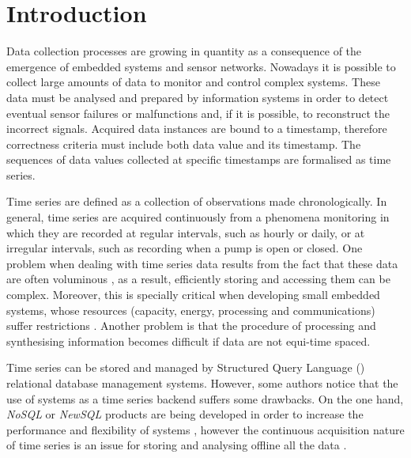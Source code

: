 


 

\section{Introduction}



Data collection processes are growing in quantity as a
consequence of the emergence of embedded systems and sensor networks.
Nowadays it is possible to collect large amounts of data to monitor
and control complex systems.  These data must be analysed and
prepared by information systems in order to detect eventual sensor
failures or malfunctions and, if it is possible, to reconstruct the
incorrect signals. Acquired data instances are bound to a timestamp,
therefore correctness criteria must include both data value and its
timestamp. The sequences of data values collected at specific
timestamps are formalised as time series.


Time series are defined as a collection of observations made
chronologically.  In general, time series are acquired continuously
from a phenomena monitoring in which they are recorded at regular
intervals, such as hourly or daily, or at irregular intervals, such as
recording when a pump is open or closed.  One problem when dealing
with time series data results from the fact that these data are often
voluminous \cite{fu11,keogh08:isax}, as a result, efficiently storing
and accessing them can be complex. Moreover, this is specially
critical when developing small embedded systems, whose resources
(capacity, energy, processing and communications) suffer restrictions
\cite{yaogehrke02}.  Another problem is that the procedure of
processing and synthesising information becomes difficult if data are
not equi-time spaced.



Time series can be stored and managed by Structured Query Language
() relational database management systems. However, some
authors \cite{dreyer94,schmidt95,stonebraker09:scidb,zhang11} notice
that the use of  systems as a time series backend suffers
some drawbacks.  On the one hand, \emph{NoSQL} or \emph{NewSQL}
products are being developed in order to increase the performance and
flexibility of  systems
\cite{atzeni13:relational_model_dead,stonebraker10,stonebraker09:scidb,zhang11},
however the continuous acquisition nature of time series is an issue for
storing and analysing offline all the data \cite{keogh97}.

